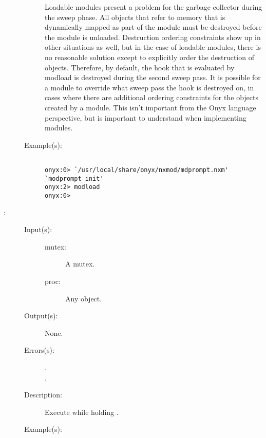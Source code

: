 \begin{description}
\begin{description}
		Loadable modules present a problem for the garbage collector
		during the sweep phase.  All objects that refer to memory that
		is dynamically mapped as part of the module must be destroyed
		before the module is unloaded.  Destruction ordering constraints
		show up in other situations as well, but in the case of loadable
		modules, there is no reasonable solution except to explicitly
		order the destruction of objects.  Therefore, by default, the
		hook that is evaluated by modload is destroyed during the second
		sweep pass.  It is possible for a module to override what sweep
		pass the hook is destroyed on, in cases where there are
		additional ordering constraints for the objects created by a
		module.  This isn't important from the Onyx language
		perspective, but is important to understand when implementing
		modules.
	\item[Example(s): ]\begin{verbatim}

onyx:0> `/usr/local/share/onyx/nxmod/mdprompt.nxm' `modprompt_init'
onyx:2> modload
onyx:0>
	\end{verbatim}
	\end{description}
\label{systemdict:monitor}
\item[{\onyxop{mutex proc}{monitor}{--}}: ]
	\begin{description}\item[]
	\item[Input(s): ]
		\begin{description}\item[]
		\item[mutex: ]
			A mutex.
		\item[proc: ]
			Any object.
		\end{description}
	\item[Output(s): ] None.
	\item[Errors(s): ]
		\begin{description}\item[]
		\item[.]
		\item[.]
		\end{description}
	\item[Description: ]
		Execute  while holding .
	\item[Example(s): ]\begin{verbatim}


\end{verbatim}
\end{description}
\end{description}
